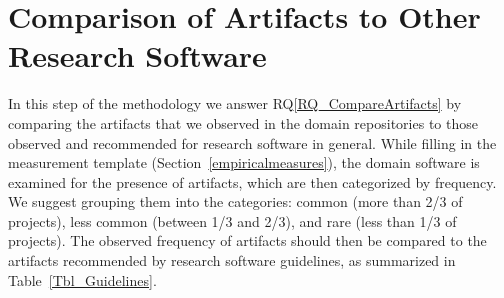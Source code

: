 \documentclass[runningheads]{llncs}
\newcommand{\rqref}[1]{RQ\ref{#1}}
\begin{document}
\section{Comparison of Artifacts to Other Research Software}
\label{Sec_CompareArtifacts}

In this step of the methodology we answer \rqref{RQ_CompareArtifacts} by
comparing the artifacts that we observed in the domain repositories to those
observed and recommended for research software in general.  While filling in the
measurement template (Section~\ref{empiricalmeasures}), the domain software is
examined for the presence of artifacts, which are then categorized by frequency.
We suggest grouping them into the categories: common (more than 2/3 of
projects), less common (between 1/3 and 2/3), and rare (less than 1/3 of
projects). The observed frequency of artifacts should then be compared to the
artifacts recommended by research software guidelines, as summarized in
Table~\ref{Tbl_Guidelines}.  
\end{document}
